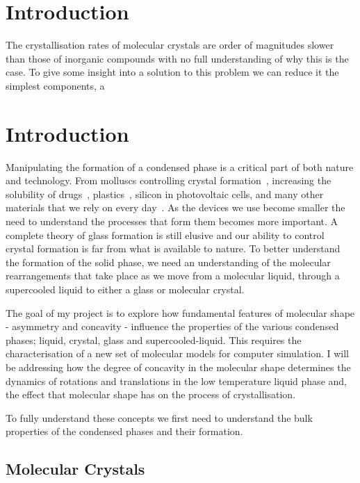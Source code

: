 \chapter {Introduction}

The crystallisation rates of molecular crystals are order of magnitudes slower than those of inorganic compounds with no full understanding of why this is the case. To give some insight into a solution to this problem we can reduce it the simplest components, a 

\chapter{Introduction}

Manipulating the formation of a condensed phase is a critical part of both nature and technology. From molluscs controlling crystal formation~\cite{de-yoreo:03}, increasing the solubility of drugs~\cite{hancock:00}, plastics~\cite{bennemann:99}, silicon in photovoltaic cells\tocite, and many other materials that we rely on every day~\cite{kim:07}. As the devices we use become smaller the need to understand the processes that form them becomes more important. A complete theory of glass formation is still elusive and our ability to control crystal formation is far from what is available to nature. To better understand the formation of the solid phase, we need an understanding of the molecular rearrangements that take place as we move from a molecular liquid, through a supercooled liquid to either a glass or molecular crystal.

The goal of my project is to explore how fundamental features of molecular shape - asymmetry and concavity - influence the properties of the various condensed phases; liquid, crystal, glass and supercooled-liquid. This requires the characterisation of a new set of molecular models for computer simulation. I will be addressing how the degree of concavity in the molecular shape determines the dynamics of rotations and translations in the low temperature liquid phase and, the effect that molecular shape has on the process of crystallisation.

To fully understand these concepts we first need to understand the bulk properties of the condensed phases and their formation.


\section{Molecular Crystals}
\label{sec:molecular crystals}

